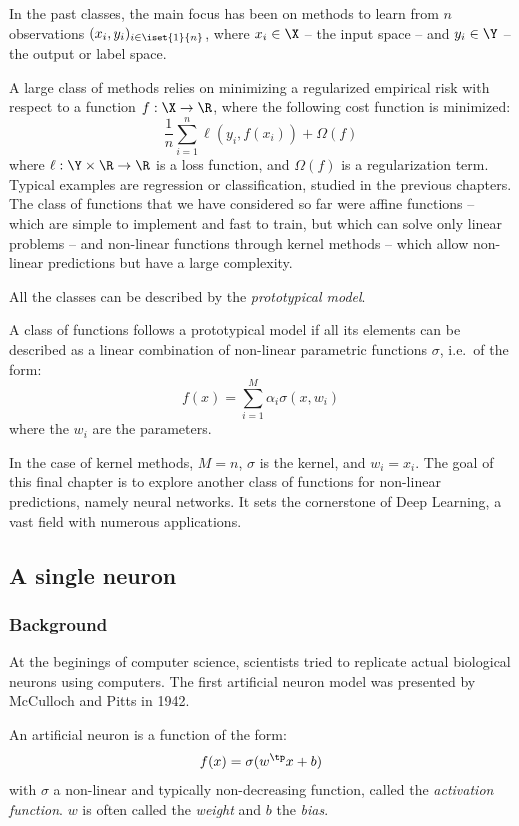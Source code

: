 \documentclass[toc, titlepaged]{../cs-classes/cs-classes}
\begin{document}
In the past classes, the main focus has been on methods to learn from $n$ observations $(x_i, y_i)_{i\in\iset{1}{n}}$, where $x_i\in\X$ -- the input space -- and $y_i\in\Y$ -- the output or label space.

A large class of methods relies on minimizing a regularized empirical risk with respect to a function $f:\X\to\R$, where the following cost function is minimized:
\begin{equation*}
    \frac{1}{n}\sum_{i=1}^n \ell(y_i, f(x_i))+\Omega(f)
\end{equation*}
where $\ell:\Y\times\R\to\R$ is a loss function, and $\Omega(f)$ is a regularization term. Typical examples are regression or classification, studied in the previous chapters. The class of functions that we have considered so far were affine functions -- which are simple to implement and fast to train, but which can solve only linear problems -- and non-linear functions through kernel methods -- which allow non-linear predictions but have a large complexity.

All the classes can be described by the \emph{prototypical model}.
\begin{definition}
    A class of functions follows a prototypical model if all its elements can be described as a linear combination of non-linear parametric functions $\sigma$, i.e.~of the form:
    \begin{equation*}
        f(x)=\sum_{i=1}^M\alpha_i\sigma(x, w_i)
    \end{equation*}
    where the $w_i$ are the parameters.
\end{definition}
In the case of kernel methods, $M=n$, $\sigma$ is the kernel, and $w_i=x_i$. The goal of this final chapter is to explore another class of functions for non-linear predictions, namely neural networks. It sets the cornerstone of Deep Learning, a vast field with numerous applications.

\subsection{A single neuron}
\subsubsection{Background}
At the beginings of computer science, scientists tried to replicate actual biological neurons using computers. The first artificial neuron model was presented by McCulloch and Pitts in 1942. 
\begin{definition}
    An artificial neuron is a function of the form:
    \begin{equation*}
        f(x)=\sigma(w^\tp x+b)
    \end{equation*}    
    with $\sigma$ a non-linear and typically non-decreasing function, called the \emph{activation function}. $w$ is often called the \emph{weight} and $b$ the \emph{bias}.
\end{definition}
\end{document}
